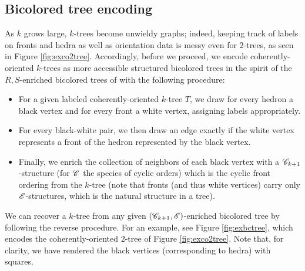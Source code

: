 \documentclass[sectionflow,singlespace,twoside,boldmathhdr]{brandiss} %
\numberwithin{section}{chapter}
\numberwithin{figure}{chapter}
\begin{document}
\subsection{Bicolored tree encoding}\label{ss:bctree}
As $k$ grows large, $k$-trees become unwieldy graphs; indeed, keeping track of labels on fronts and hedra as well as orientation data is messy even for $2$-trees, as seen in Figure \ref{fig:exco2tree}.
Accordingly, before we proceed, we encode coherently-oriented $k$-trees as more accessible structured bicolored trees in the spirit of the $R, S$-enriched bicolored trees of \cite[\S 3.2]{bll:species} with the following procedure:
\begin{itemize}
  \item For a given labeled coherently-oriented $k$-tree $T$, we draw for every hedron a black vertex and for every front a white vertex, assigning labels appropriately.
  \item For every black-white pair, we then draw an edge exactly if the white vertex represents a front of the hedron represented by the black vertex.
  \item Finally, we enrich the collection of neighbors of each black vertex with a $\mathscr{C}_{k+1}$-structure (for $\mathscr{C}$ the species of cyclic orders) which is the cyclic front ordering from the $k$-tree (note that fronts (and thus white vertices) carry only $\mathscr{E}$-structures, which is the natural structure in a tree).
\end{itemize}
We can recover a $k$-tree from any given $\left( {\mathscr{C}_{k+1}, \mathscr{E}} \right)$-enriched bicolored tree by following the reverse procedure.
For an example, see Figure \ref{fig:exbctree}, which encodes the coherently-oriented $2$-tree of Figure \ref{fig:exco2tree}.
Note that, for clarity, we have rendered the black vertices (corresponding to hedra) with squares.
\end{document}
